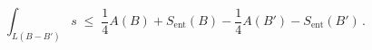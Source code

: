 \begin{equation}
\int_{L(B-B')} s \; \leq \; \frac{1}{4} A(B) + S_{\text{ent}}(B) -
\frac{1}{4} A(B') - S_{\text{ent}}(B') \, .
\end{equation}

